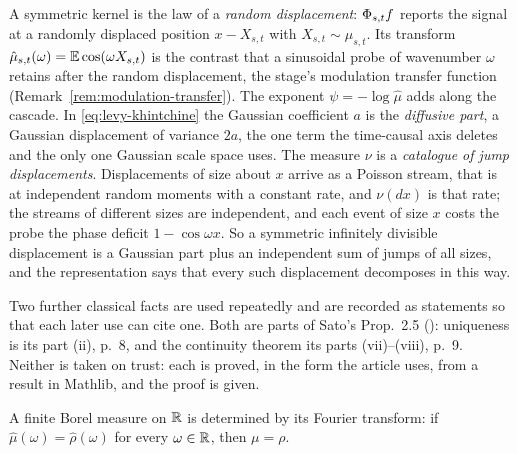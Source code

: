 \begin{remark}\label{rem:displacement-dictionary}
A symmetric kernel is the law of a \emph{random displacement}: $\Phi_{s,t}f$ reports the
signal at a randomly displaced position $x - X_{s,t}$ with $X_{s,t} \sim \mu_{s,t}$. Its
transform $\hat\mu_{s,t}(\omega) = \mathbb{E}\cos(\omega X_{s,t})$ is the contrast that a
sinusoidal probe of wavenumber $\omega$ retains after the random displacement, the stage's
modulation transfer function (Remark~\ref{rem:modulation-transfer}). The exponent
$\psi = -\log\hat\mu$ adds along the cascade. In \ref{eq:levy-khintchine} the Gaussian
coefficient $a$ is the \emph{diffusive part}, a Gaussian displacement of variance $2a$, the
one term the time-causal axis deletes and
the only one Gaussian scale space uses. The measure $\nu$ is a \emph{catalogue of jump
displacements}. Displacements of size about $x$ arrive as a Poisson stream, that is at
independent random moments with a constant rate, and $\nu(dx)$ is that rate; the streams of
different sizes are independent, and each event of size $x$ costs the probe the phase
deficit $1 - \cos\omega x$. So a symmetric infinitely divisible displacement is a Gaussian
part plus an independent sum of jumps of all sizes, and the representation says that every
such displacement decomposes in this way.
\end{remark}

Two further classical facts are used repeatedly and are recorded as statements so that
each later use can cite one. Both are parts of Sato's Prop.~2.5 ():
uniqueness is its part (ii), p.~8, and the continuity theorem its parts (vii)--(viii),
p.~9. Neither is taken on trust: each is proved, in the form the article uses, from a
result in Mathlib, and the proof is given.

\begin{proposition}\label{prop:fourier-uniqueness}
A finite Borel measure on $\mathbb{R}$ is determined by its Fourier transform: if
$\hat\mu(\omega) = \hat\rho(\omega)$ for every $\omega \in \mathbb{R}$, then $\mu = \rho$.
\end{proposition}

